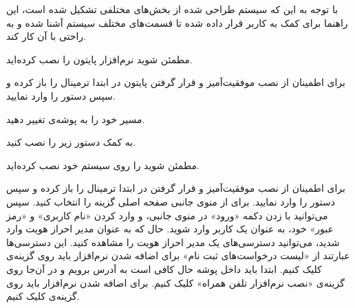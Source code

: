 
با توجه به این که سیستم طراحی شده از بخش‌های مختلفی تشکیل شده است، این راهنما برای کمک به کاربر قرار داده شده تا قسمت‌های مختلف سیستم آشنا شده و به راحتی با آن کار کند.
	 
	
		 مطمئن شوید نرم‌افزار پایتون را نصب کرده‌اید.
		
		 برای اطمینان از نصب موفقیت‌آمیز و قرار گرفتن پایتون در  ابتدا ترمینال را باز کرده و سپس دستور  را وارد نمایید.
		
		 مسیر خود را به پوشه‌ی  تغییر دهید.
	
		
		
		
		 به کمک دستور زیر  را نصب کنید.
		

	

	 
	
		 مطمئن شوید  را روی سیستم خود نصب کرده‌اید.
		
		 برای اطمینان از نصب موفقیت‌آمیز و قرار گرفتن  در  ابتدا ترمینال را باز کرده و سپس دستور  را وارد نمایید.
	 
			 برای  از منوی جانبی صفحه اصلی گزینه  را انتخاب کنید. سپس می‌توانید با زدن دکمه «ورود» در منوی جانبی، و وارد کردن «نام کاربری» و «رمز عبور» خود، به عنوان یک کاربر  وارد شوید.
			 حال که به عنوان مدیر احراز هویت وارد شدید، می‌توانید دسترسی‌های یک مدیر احراز هویت را مشاهده کنید. این دسترسی‌ها عبارتند از «لیست درخواست‌های ثبت نام»
			 برای اضافه شدن نرم‌افزار باید روی گزینه‌ی  کلیک کنیم.
	 
			 ابتدا باید داخل پوشه 
			 حال کافی است به آدرس  برویم و در آن‌جا روی گزینه‌ی «نصب نرم‌افزار تلفن همراه» کلیک کنیم.
			 برای اضافه شدن نرم‌افزار باید روی گزینه‌ی  کلیک کنیم.
